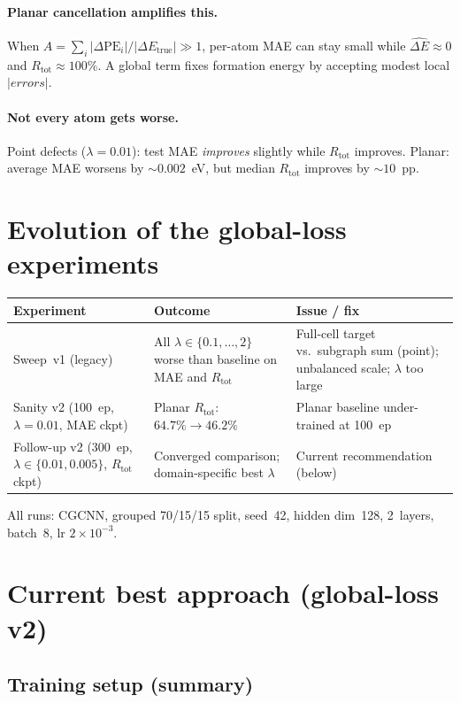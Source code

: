 \documentclass[11pt,a4paper]{article}
\newcommand{\dPE}{\Delta\mathrm{PE}}
\newcommand{\dEtrue}{\Delta E_{\mathrm{true}}}
\newcommand{\dEhat}{\widehat{\Delta E}}
\begin{document}
\paragraph{Planar cancellation amplifies this.}
When $A=\sum_i|\dPE_i|/|\dEtrue|\gg 1$, per-atom MAE can stay small while $\dEhat\approx 0$ and $R_{\mathrm{tot}}\approx 100\%$. A global term fixes formation energy by accepting modest local $|errors|$.

\paragraph{Not every atom gets worse.}
Point defects ($\lambda=0.01$): test MAE \emph{improves} slightly while $R_{\mathrm{tot}}$ improves. Planar: average MAE worsens by ${\sim}0.002$~eV, but median $R_{\mathrm{tot}}$ improves by ${\sim}10$~pp.

\section*{Evolution of the global-loss experiments}

{\footnotesize
\begin{tabularx}{\linewidth}{@{}l Y Y@{}}
  \toprule
  Experiment & Outcome & Issue / fix \\
  \midrule
  Sweep~v1 (legacy) &
  All $\lambda\in\{0.1,\ldots,2\}$ worse than baseline on MAE and $R_{\mathrm{tot}}$ &
  Full-cell target vs.\ subgraph sum (point); unbalanced scale; $\lambda$ too large \\
  Sanity v2 (100~ep, $\lambda=0.01$, MAE ckpt) &
  Planar $R_{\mathrm{tot}}$: $64.7\%\to 46.2\%$ &
  Planar baseline under-trained at 100~ep \\
  Follow-up v2 (300~ep, $\lambda\in\{0.01,0.005\}$, $R_{\mathrm{tot}}$ ckpt) &
  Converged comparison; domain-specific best $\lambda$ &
  Current recommendation (below) \\
  \bottomrule
\end{tabularx}
}

\medskip
\noindent All runs: CGCNN, grouped 70/15/15 split, seed~42, hidden dim~128, 2~layers, batch~8, lr $2\times10^{-3}$.

\section*{Current best approach (global-loss v2)}

\subsection*{Training setup (summary)}
\end{document}

